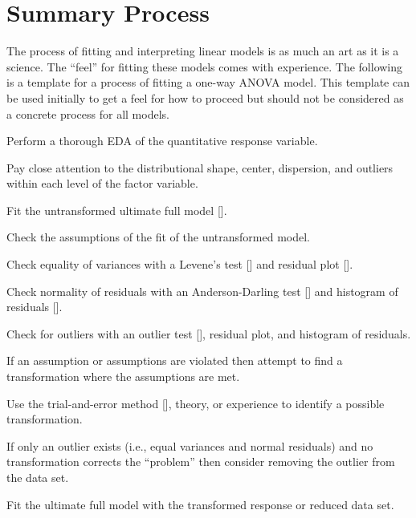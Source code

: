\documentclass[10pt,openany]{book}\usepackage[]{graphicx}\usepackage[]{color}
\begin{document}
\section{Summary Process}
The process of fitting and interpreting linear models is as much an art as it is a science.  The ``feel'' for fitting these models comes with experience.  The following is a template for a process of fitting a one-way ANOVA model.  This template can be used initially to get a feel for how to proceed but should not be considered as a concrete process for all models.

\begin{Enumerate}
  \item Perform a thorough EDA of the quantitative response variable.
    \begin{Itemize}
      \item Pay close attention to the distributional shape, center, dispersion, and outliers within each level of the factor variable.
    \end{Itemize}
  \item Fit the untransformed ultimate full model [].
  \item Check the assumptions of the fit of the untransformed model.
    \begin{Itemize}
      \item Check equality of variances with a Levene's test [] and residual plot [].
      \item Check normality of residuals with an Anderson-Darling test [] and histogram of residuals [].
      \item Check for outliers with an outlier test [], residual plot, and histogram of residuals.
    \end{Itemize}
  \item If an assumption or assumptions are violated then attempt to find a transformation where the assumptions are met.
    \begin{Itemize}
      \item Use the trial-and-error method [], theory, or experience to identify a possible transformation.
      \item If only an outlier exists (i.e., equal variances and normal residuals) and no transformation corrects the ``problem'' then consider removing the outlier from the data set.
      \item Fit the ultimate full model with the transformed response or reduced data set.

\end{Itemize}
\end{Enumerate}
\end{document}
